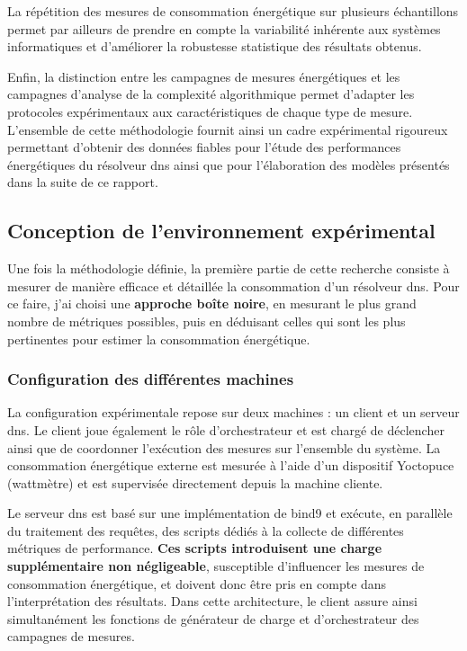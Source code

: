 \documentclass[12pt, a4paper]{report}
\begin{document}
	La répétition des mesures de consommation énergétique sur plusieurs échantillons permet par ailleurs de prendre en compte la variabilité inhérente aux systèmes informatiques et d'améliorer la robustesse statistique des résultats obtenus.

	Enfin, la distinction entre les campagnes de mesures énergétiques et les campagnes d'analyse de la complexité algorithmique permet d'adapter les protocoles expérimentaux aux caractéristiques de chaque type de mesure. L'ensemble de cette méthodologie fournit ainsi un cadre expérimental rigoureux permettant d'obtenir des données fiables pour l'étude des performances énergétiques du résolveur \gls{dns} ainsi que pour l'élaboration des modèles présentés dans la suite de ce rapport.


	\subsection{Conception de l'environnement expérimental}

	Une fois la méthodologie définie, la première partie de cette recherche consiste à mesurer de manière efficace et détaillée la consommation d'un résolveur \gls{dns}. Pour ce faire, j'ai choisi une \textbf{approche boîte noire}, en mesurant le plus grand nombre de métriques possibles, puis en déduisant celles qui sont les plus pertinentes pour estimer la consommation énergétique.

	\subsubsection{Configuration des différentes machines}

	La configuration expérimentale repose sur deux machines : un client et un serveur \gls{dns}. Le client joue également le rôle d'orchestrateur et est chargé de déclencher ainsi que de coordonner l'exécution des mesures sur l'ensemble du système. La consommation énergétique externe est mesurée à l'aide d'un dispositif Yoctopuce (wattmètre) \cite{Yoctopuce} et est supervisée directement depuis la machine cliente.

	Le serveur \gls{dns} est basé sur une implémentation de \gls{bind9} et exécute, en parallèle du traitement des requêtes, des scripts dédiés à la collecte de différentes métriques de performance. \textbf{Ces scripts introduisent une charge supplémentaire non négligeable}, susceptible d'influencer les mesures de consommation énergétique, et doivent donc être pris en compte dans l'interprétation des résultats. Dans cette architecture, le client assure ainsi simultanément les fonctions de générateur de charge et d'orchestrateur des campagnes de mesures.
\end{document}
